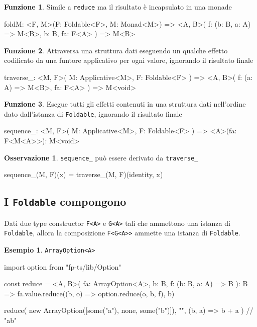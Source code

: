 \documentclass[12pt]{article}
\theoremstyle{definition}
\newtheorem{example}{Esempio}[section]
\newtheorem{observation}{Osservazione}[section]
\newtheorem{function}{Funzione}[section]
\newenvironment{code}
  {\vspace{0.5cm} \VerbatimEnvironment\begin{typescriptcode}}
  {\end{typescriptcode} \vspace{0.2cm}}
\begin{document}
\begin{function}
Simile a \texttt{reduce} ma il risultato è incapsulato in una monade

\begin{code}
foldM: <F, M>(F: Foldable<F>, M: Monad<M>) => <A, B>(
  f: (b: B, a: A) => M<B>,
  b: B,
  fa: F<A>
) => M<B>
\end{code}
\end{function}

\begin{function}
Attraversa una struttura dati eseguendo un qualche effetto codificato da una funtore applicativo per ogni valore, ignorando il risultato finale

\begin{code}
traverse_: <M, F>(
  M: Applicative<M>,
  F: Foldable<F>
) => <A, B>(
  f: (a: A) => M<B>,
  fa: F<A>
) => M<void>
\end{code}
\end{function}

\begin{function}
Esegue tutti gli effetti contenuti in una struttura dati nell'ordine dato dall'istanza di \texttt{Foldable}, ignorando il risultato finale

\begin{code}
sequence_: <M, F>(
  M: Applicative<M>,
  F: Foldable<F>
) => <A>(fa: F<M<A>>): M<void>
\end{code}
\end{function}

\begin{observation}
\texttt{sequence\_} può essere derivato da \texttt{traverse\_}

\begin{code}
sequence_(M, F)(x) = traverse_(M, F)(identity, x)
\end{code}
\end{observation}

\subsection{I \texttt{Foldable} compongono}

Dati due type constructor \texttt{F<A>} e \texttt{G<A>} tali che ammettono una istanza di \texttt{Foldable}, allora la composizione \texttt{F<G<A>>}
ammette una istanza di \texttt{Foldable}.

\begin{example}
\texttt{ArrayOption<A>}

\begin{code}
import { option } from "fp-ts/lib/Option"

const reduce = <A, B>(
  fa: ArrayOption<A>,
  b: B,
  f: (b: B, a: A) => B
): B => fa.value.reduce((b, o) => option.reduce(o, b, f), b)

reduce(
  new ArrayOption([some("a"), none, some("b")]),
  "",
  (b, a) => b + a
) // "ab"
\end{code}
\end{example}
\end{document}
